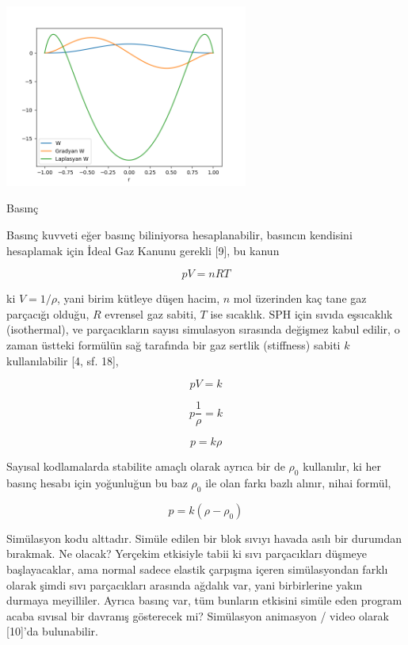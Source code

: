 \documentclass[12pt,fleqn]{article}\usepackage{../../common}
\begin{document}
\includegraphics[height=6cm]{compscieng_app40sph_03.png}

Basınç

Basınç kuvveti eğer basınç biliniyorsa hesaplanabilir, basıncın kendisini
hesaplamak için İdeal Gaz Kanunu gerekli [9], bu kanun

$$
p V = n R T
$$

ki $V = 1 / \rho$, yani birim kütleye düşen hacim, $n$ mol üzerinden kaç tane
gaz parçacığı olduğu, $R$ evrensel gaz sabiti, $T$ ise sıcaklık. SPH için sıvıda
eşsıcaklık (isothermal), ve parçacıkların sayısı simulasyon sırasında değişmez
kabul edilir, o zaman üstteki formülün sağ tarafında bir gaz sertlik (stiffness)
sabiti $k$ kullanılabilir [4, sf. 18], 

$$
p V = k
$$

$$
p \frac{1}{\rho} = k
$$

$$
p  = k \rho
$$

Sayısal kodlamalarda stabilite amaçlı olarak ayrıca bir de $\rho_0$ kullanılır,
ki her basınç hesabı için yoğunluğun bu baz $\rho_0$ ile olan farkı bazlı
alınır, nihai formül,

$$
p  = k (\rho - \rho_0)
$$

Simülasyon kodu alttadır. Simüle edilen bir blok sıvıyı havada asılı bir
durumdan bırakmak. Ne olacak? Yerçekim etkisiyle tabii ki sıvı parçacıkları
düşmeye başlayacaklar, ama normal sadece elastik çarpışma içeren simülasyondan
farklı olarak şimdi sıvı parçacıkları arasında ağdalık var, yani birbirlerine
yakın durmaya meyilliler. Ayrıca basınç var, tüm bunların etkisini simüle eden
program acaba sıvısal bir davranış gösterecek mi? Simülasyon animasyon / video
olarak [10]'da bulunabilir.

\inputminted[fontsize=\footnotesize]{python}{simsph.py}
\end{document}
